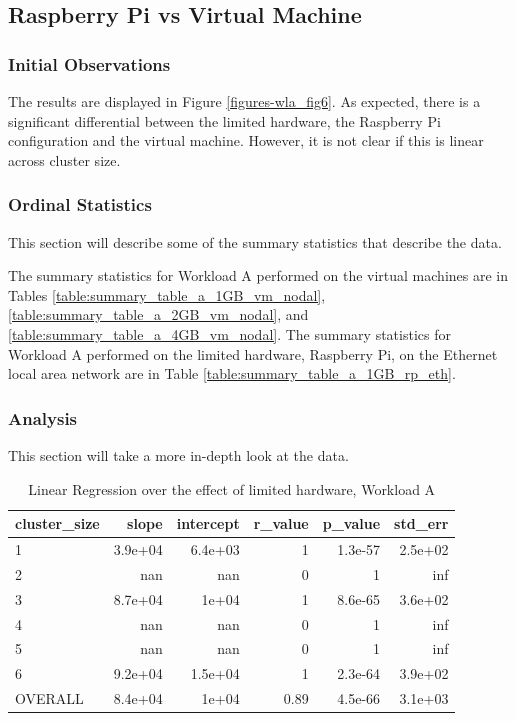 \subsection{Raspberry Pi vs Virtual Machine}
\subsubsection{Initial Observations}
The results are displayed in Figure \ref{figures-wla_fig6}.  As expected, there is a significant differential between the limited hardware, the Raspberry Pi configuration and the virtual machine.  However, it is not clear if this is linear across cluster size. 

\subsubsection{Ordinal Statistics}
This section will describe some of the summary statistics that describe the data.  

The summary statistics for Workload A performed on the virtual machines are in Tables \ref{table:summary_table_a_1GB_vm_nodal}, \ref{table:summary_table_a_2GB_vm_nodal}, and \ref{table:summary_table_a_4GB_vm_nodal}.
The summary statistics for Workload A performed on the limited hardware, Raspberry Pi, on the Ethernet local area network are in Table \ref{table:summary_table_a_1GB_rp_eth}.



\subsubsection{Analysis}
This section will take a more in-depth look at the data.




\begin{table}[H]
\centering
\begin{tabular}{lrrrrr}
\toprule
cluster\_size &   slope &  intercept &  r\_value &  p\_value &  std\_err \\
\midrule
           1 & 3.9e+04 &    6.4e+03 &        1 &  1.3e-57 &  2.5e+02 \\
           2 &     nan &        nan &        0 &        1 &      inf \\
           3 & 8.7e+04 &      1e+04 &        1 &  8.6e-65 &  3.6e+02 \\
           4 &     nan &        nan &        0 &        1 &      inf \\
           5 &     nan &        nan &        0 &        1 &      inf \\
           6 & 9.2e+04 &    1.5e+04 &        1 &  2.3e-64 &  3.9e+02 \\
     OVERALL & 8.4e+04 &      1e+04 &     0.89 &  4.5e-66 &  3.1e+03 \\
\bottomrule
\end{tabular}
\caption{Linear Regression over the effect of limited hardware, Workload A}
\label{table:rp_v_vm_a}
\end{table}





